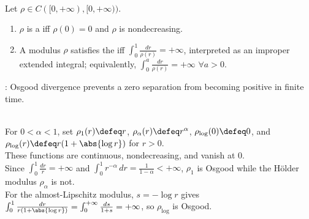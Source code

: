 \begin{definition} \label{def:osgood-modulus-of-continuity} \\
Let $\rho\in C([0,+\infty),[0,+\infty))$.
\begin{enumerate}[label=(\roman*)]
\setlength{\itemsep}{0pt}
\item $\rho$ is a  iff $\rho(0)=0$ and $\rho$ is nondecreasing.
\item A modulus $\rho$ satisfies the  iff $\int_0^1\frac{dr}{\rho(r)}=+\infty$, interpreted as an improper extended integral; equivalently, $\int_0^a\frac{dr}{\rho(r)}=+\infty$ $\forall a>0$.
\end{enumerate}
: Osgood divergence prevents a zero separation from becoming positive in finite time.
\end{definition}

\begin{example} \label{ex:osgood-modulus-threshold} \\
For $0<\alpha<1$, set $\rho_1(r)\defeq r$, $\rho_\alpha(r)\defeq r^\alpha$, $\rho_{\log}(0)\defeq0$, and $\rho_{\log}(r)\defeq r(1+\abs{\log r})$ for $r>0$.\\
These functions are continuous, nondecreasing, and vanish at $0$.\\
Since $\int_0^1\frac{dr}{r}=+\infty$ and $\int_0^1r^{-\alpha}\,dr=\frac{1}{1-\alpha}<+\infty$, $\rho_1$ is Osgood while the H\"older modulus $\rho_\alpha$ is not.\\
For the almost-Lipschitz modulus, $s=-\log r$ gives $\int_0^1\frac{dr}{r(1+\abs{\log r})}=\int_0^{+\infty}\frac{ds}{1+s}=+\infty$, so $\rho_{\log}$ is Osgood.
\end{example}

